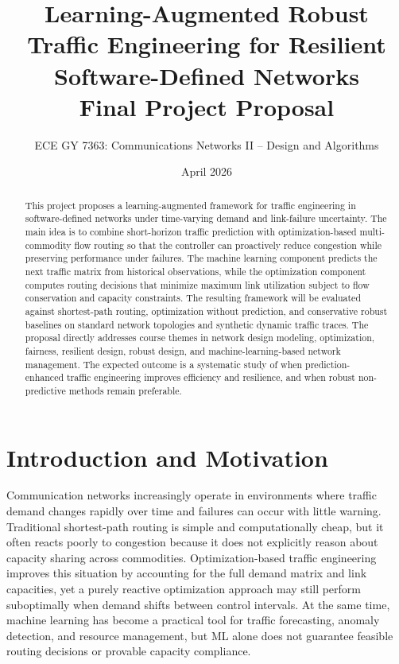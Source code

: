 \documentclass[11pt]{article}
\title{\textbf{Learning-Augmented Robust Traffic Engineering for Resilient Software-Defined Networks}\\[0.3em]
\large Final Project Proposal}
\author{ECE GY 7363: Communications Networks II -- Design and Algorithms}
\date{April 2026}
\begin{document}
\maketitle

\begin{abstract}
This project proposes a learning-augmented framework for traffic engineering in software-defined networks under time-varying demand and link-failure uncertainty. The main idea is to combine short-horizon traffic prediction with optimization-based multi-commodity flow routing so that the controller can proactively reduce congestion while preserving performance under failures. The machine learning component predicts the next traffic matrix from historical observations, while the optimization component computes routing decisions that minimize maximum link utilization subject to flow conservation and capacity constraints. The resulting framework will be evaluated against shortest-path routing, optimization without prediction, and conservative robust baselines on standard network topologies and synthetic dynamic traffic traces. The proposal directly addresses course themes in network design modeling, optimization, fairness, resilient design, robust design, and machine-learning-based network management. The expected outcome is a systematic study of when prediction-enhanced traffic engineering improves efficiency and resilience, and when robust non-predictive methods remain preferable.
\end{abstract}

\section{Introduction and Motivation}
Communication networks increasingly operate in environments where traffic demand changes rapidly over time and failures can occur with little warning. Traditional shortest-path routing is simple and computationally cheap, but it often reacts poorly to congestion because it does not explicitly reason about capacity sharing across commodities. Optimization-based traffic engineering improves this situation by accounting for the full demand matrix and link capacities, yet a purely reactive optimization approach may still perform suboptimally when demand shifts between control intervals. At the same time, machine learning has become a practical tool for traffic forecasting, anomaly detection, and resource management, but ML alone does not guarantee feasible routing decisions or provable capacity compliance.
\end{document}
